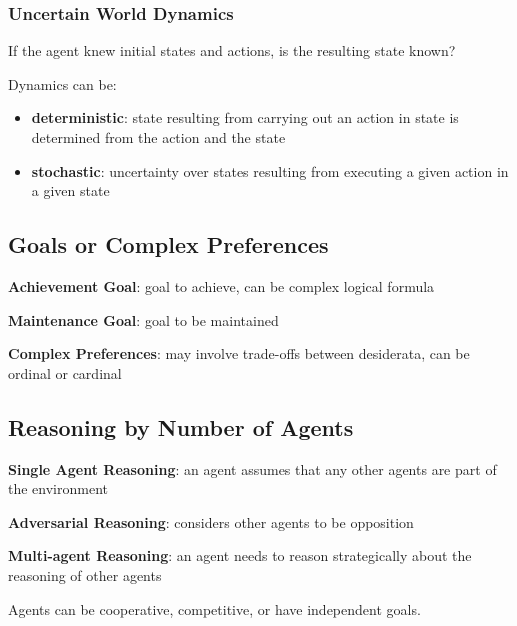 \documentclass[11pt]{article}
\begin{document}
\subsubsection{Uncertain World Dynamics}
\label{sec:org46dd87e}
If the agent knew initial states and actions, is the resulting state known?

Dynamics can be:
\begin{itemize}
\item \textbf{deterministic}: state resulting from carrying out an action in state is determined from the
action and the state
\item \textbf{stochastic}: uncertainty over states resulting from executing a given action in a given state
\end{itemize}
\subsection{Goals or Complex Preferences}
\label{sec:orga0e5765}
\textbf{Achievement Goal}: goal to achieve, can be complex logical formula

\textbf{Maintenance Goal}: goal to be maintained

\textbf{Complex Preferences}: may involve trade-offs between desiderata, can be ordinal or cardinal
\subsection{Reasoning by Number of Agents}
\label{sec:orgc3bd6b1}
\textbf{Single Agent Reasoning}: an agent assumes that any other agents are part of the environment

\textbf{Adversarial Reasoning}: considers other agents to be opposition

\textbf{Multi-agent Reasoning}: an agent needs to reason strategically about the reasoning of other agents

Agents can be cooperative, competitive, or have independent goals.
\end{document}
